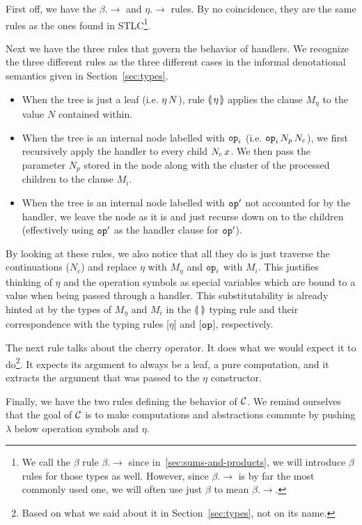 First off, we have the $\beta.\to$ and $\eta.\to$ rules. By no coincidence,
they are the same rules as the ones found in STLC\footnote{We call the
  $\beta$ rule $\beta.\to$ since in~\ref{sec:sums-and-products}, we will
  introduce $\beta$ rules for those types as well. However, since
  $\beta.\to$ is by far the most commonly used one, we will often use just
  $\beta$ to mean $\beta.\to$.}.

Next we have the three rules that govern the behavior of handlers. We
recognize the three different rules as the three different cases in the
informal denotational semantics given in Section~\ref{sec:types}.

\begin{itemize}
\item When the tree is just a leaf (i.e. $\eta\,N$), rule
  $\llparenthesis \, \eta \, \rrparenthesis$ applies the clause $M_\eta$ to the value $N$ contained
  within.
\item When the tree is an internal node labelled with $\mathtt{op}_i$
  (i.e. $\mathtt{op}_i\,N_p\,N_c$), we first recursively apply the
  handler to every child $N_c\,x$. We then pass the parameter $N_p$
  stored in the node along with the cluster of the processed children to
  the clause $M_i$.
\item When the tree is an internal node labelled with $\mathtt{op}'$ not
  accounted for by the handler, we leave the node as it is and just recurse
  down on to the children (effectively using $\mathtt{op}'$ as the handler
  clause for $\mathtt{op}'$).
\end{itemize}

By looking at these rules, we also notice that all they do is just traverse
the continuations ($N_c$) and replace $\eta$ with $M_\eta$ and $\mathtt{op}_i$
with $M_i$. This justifies thinking of $\eta$ and the operation symbols as
special variables which are bound to a value when being passed through a
handler. This substitutability is already hinted at by the types of
$M_\eta$ and $M_i$ in the $\llparenthesis \,  \, \rrparenthesis$ typing rule and their correspondence
with the typing rules [$\eta$] and [$\mathtt{op}$], respectively.

The next rule talks about the cherry operator. It does what we would expect
it to do\footnote{Based on what we said about it in
  Section~\ref{sec:types}, not on its name.}. It expects its argument to
always be a leaf, a pure computation, and it extracts the argument that was
passed to the $\eta$ constructor.

Finally, we have the two rules defining the behavior of $\mathcal{C}$. We remind
ourselves that the goal of $\mathcal{C}$ is to make computations and abstractions
commute by pushing $\lambda$ below operation symbols and $\eta$.

